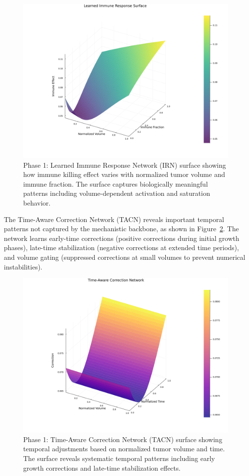 \documentclass{juliacon}
\begin{document}
\begin{figure}[H]\centering
\includegraphics[width=\linewidth]{immune_network_surface.png}
\caption{Phase 1: Learned Immune Response Network (IRN) surface showing how immune killing effect varies with normalized tumor volume and immune fraction. The surface captures biologically meaningful patterns including volume-dependent activation and saturation behavior.}
\label{fig:irn_surface}
\end{figure}

The Time-Aware Correction Network (TACN) reveals important temporal patterns not captured by the mechanistic backbone, as shown in Figure~\ref{fig:tacn_surface}. The network learns early-time corrections (positive corrections during initial growth phases), late-time stabilization (negative corrections at extended time periods), and volume gating (suppressed corrections at small volumes to prevent numerical instabilities).

\begin{figure}[H]\centering
\includegraphics[width=\linewidth]{correction_network_surface.png}
\caption{Phase 1: Time-Aware Correction Network (TACN) surface showing temporal adjustments based on normalized tumor volume and time. The surface reveals systematic temporal patterns including early growth corrections and late-time stabilization effects.}
\label{fig:tacn_surface}
\end{figure}
\end{document}
